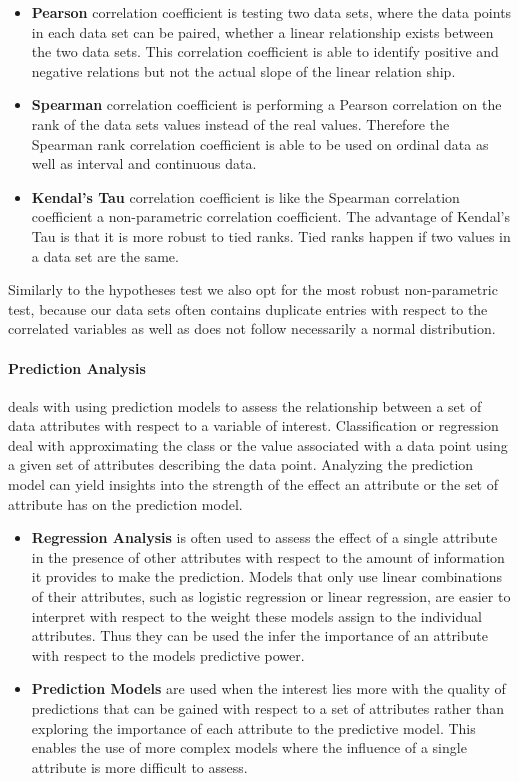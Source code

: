 \begin{itemize}
\item\textbf{Pearson} correlation coefficient is testing two data sets, where the data points in each data set can be paired, whether a linear relationship exists between the two data sets.
This correlation coefficient is able to identify positive and negative relations but not the actual slope of the linear relation ship.

\item\textbf{Spearman} correlation coefficient is performing a Pearson correlation on the rank of the data sets values instead of the real values.
Therefore the Spearman rank correlation coefficient is able to be used on ordinal data as well as interval and continuous data. 

\item\textbf{Kendal's Tau} correlation coefficient is like the Spearman correlation coefficient a non-parametric correlation coefficient.
The advantage of Kendal's Tau is that it is more robust to tied ranks.
Tied ranks happen if two values in a data set are the same.
\end{itemize}

Similarly to the hypotheses test we also opt for the most robust non-parametric test, because our data sets often contains duplicate entries with respect to the correlated variables as well as does not follow necessarily a normal distribution.

\paragraph{Prediction Analysis} deals with using prediction models to assess the relationship between a set of data attributes with respect to a variable of interest.
Classification or regression deal with approximating the class or the value associated with a data point using a given set of attributes describing the data point.
Analyzing the prediction model can yield insights into the strength of the effect an attribute or the set of attribute has on the prediction model.
\begin{itemize}
\item\textbf{Regression Analysis} is often used to assess the effect of a single attribute in the presence of other attributes with respect to the amount of information it provides to make the prediction.
Models that only use linear combinations of their attributes, such as logistic regression or linear regression, are easier to interpret with respect to the weight these models assign to the individual attributes.
Thus they can be used the infer the importance of an attribute with respect to the models predictive power.
\item\textbf{Prediction Models} are used when the interest lies more with the quality of predictions that can be gained with respect to a set of attributes rather than exploring the importance of each attribute to the predictive model.
This enables the use of more complex models where the influence of a single attribute is more difficult to assess.
\end{itemize}


